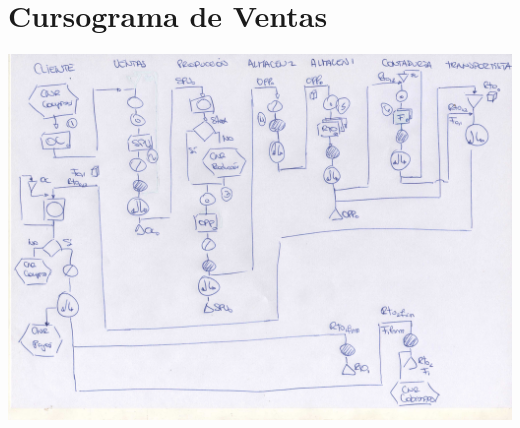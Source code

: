 \section{Cursograma de Ventas}
\includegraphics [scale=0.65, angle=90]{Empresa/Circuitos/Ventas/ventas.jpg}

\pagebreak
